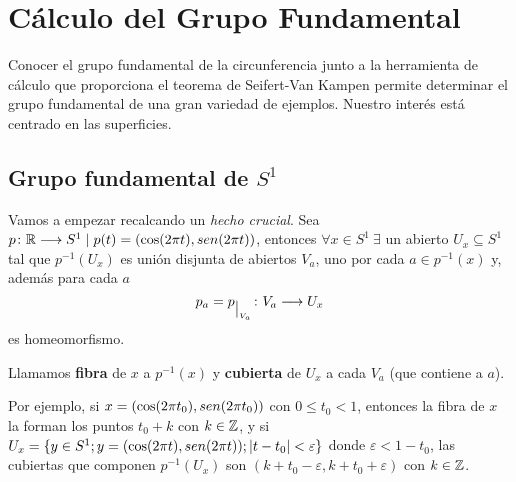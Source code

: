 \documentclass[GTS.tex]{subfiles}
\begin{document}
%
\renewcommand\chaptername{\Huge Tema}

\titleformat{\chapter}[display]
    {\normalfont\huge\bfseries}{\chaptertitlename\ \thechapter}{10pt}{\Huge}
\titlespacing*{\chapter}{0pt}{-1cm}{10pt}
%
%
%


\setcounter{chapter}{3}

\chapter{Cálculo del Grupo Fundamental}

Conocer el grupo fundamental de la circunferencia junto a la herramienta de cálculo que proporciona el teorema de Seifert-Van Kampen permite determinar el grupo fundamental de una gran variedad de ejemplos. Nuestro interés está centrado en las superficies.

\section{Grupo fundamental de $S^1$}

Vamos a empezar recalcando un {\em hecho crucial}. Sea $p\colon{\mathbb{R}}\longrightarrow{S^1}\mid p(t)=(\cos(2\pi t),sen (2\pi t))$, entonces $\forall x\in S^1\ \exists$ un abierto $U_x\subseteq S^1$ tal que $p^{-1}(U_x)$ es unión disjunta de abiertos $V_a$, uno por cada $a\in p^{-1}(x)$ y, además para cada $a$
\[
p_a=p_{\big|_{V_a}}\colon{V_a}\longrightarrow{U_x}
\]
es homeomorfismo.
\begin{defi}
Llamamos \textbf{fibra} de $x$ a $p^{-1}(x)$ y \textbf{cubierta} de $U_x$ a cada $V_a$ (que contiene a $a$).
\end{defi}

Por ejemplo, si $x=(\cos(2\pi t_0),sen (2\pi t_0))$ con $0\leq t_0 < 1$, entonces la fibra de $x$ la forman los puntos $t_0+ k$ con $k\in \mathbb{Z}$, y si  $U_x =\{y\in S^1; y=(\cos(2\pi t),sen (2\pi t)); |t-t_0| < \varepsilon\}$ donde $\varepsilon<1-t_0$, las cubiertas que componen  $p^{-1}(U_x)$ son $(k+t_0-\varepsilon,k+t_0+\varepsilon)$ con $k\in\mathbb{Z}$.
\end{document}
